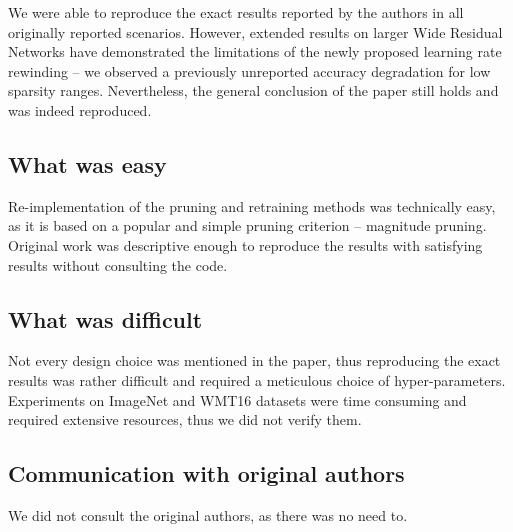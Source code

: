 We were able to reproduce the exact results reported by the authors in all originally reported scenarios. However, extended results on larger Wide Residual Networks have demonstrated the limitations of the newly proposed learning rate rewinding -- we observed a previously unreported accuracy degradation for low sparsity ranges. Nevertheless, the general conclusion of the paper still holds and was indeed reproduced.

\subsection*{What was easy}

Re-implementation of the pruning and retraining methods was technically easy, as it is based on a popular and simple pruning criterion -- magnitude pruning. Original work was descriptive enough to reproduce the results with satisfying results without consulting the code.

\subsection*{What was difficult}

Not every design choice was mentioned in the paper, thus reproducing the exact results was rather difficult and required a meticulous choice of hyper-parameters. Experiments on ImageNet and WMT16 datasets were time consuming and required extensive resources, thus we did not verify them.


\subsection*{Communication with original authors}

We did not consult the original authors, as there was no need to.

\clearpage

\renewcommand{\arraystretch}{1.5}

